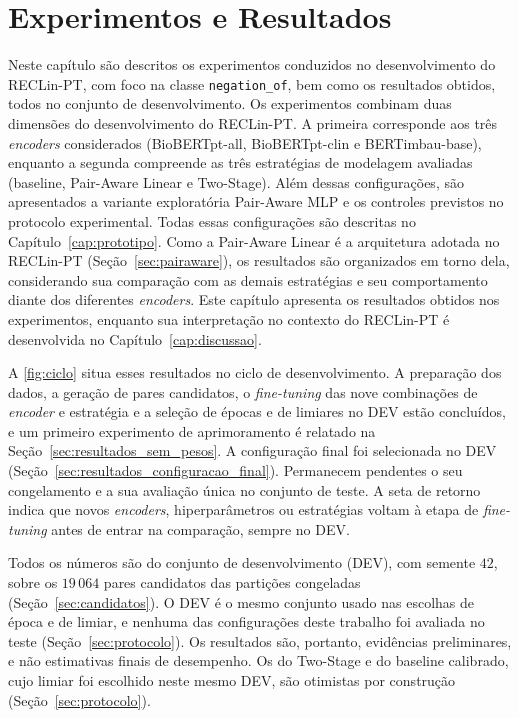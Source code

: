 \chapter[Experimentos e Resultados]{Experimentos e Resultados}
\label{cap:experimentos}

Neste capítulo são descritos os experimentos conduzidos no desenvolvimento do
RECLin-PT, com foco na classe \texttt{negation\_of}, bem como os resultados obtidos, todos no conjunto de desenvolvimento. Os experimentos combinam duas dimensões do desenvolvimento do RECLin-PT. A primeira corresponde aos três \emph{encoders} considerados (BioBERTpt-all, BioBERTpt-clin e BERTimbau-base), enquanto a segunda compreende as três estratégias de modelagem avaliadas (baseline, Pair-Aware Linear e Two-Stage). Além dessas configurações, são apresentados a variante exploratória Pair-Aware MLP e os controles previstos no protocolo experimental. Todas essas configurações são descritas no Capítulo~\ref{cap:prototipo}. Como a Pair-Aware Linear é a arquitetura adotada no RECLin-PT (Seção~\ref{sec:pairaware}), os resultados são organizados em torno dela, considerando sua comparação com as demais estratégias e seu comportamento diante dos diferentes \emph{encoders}. Este capítulo apresenta os resultados obtidos nos experimentos, enquanto sua interpretação no contexto do RECLin-PT é desenvolvida no Capítulo~\ref{cap:discussao}.

A \autoref{fig:ciclo} situa esses resultados no ciclo de desenvolvimento. A preparação
dos dados, a geração de pares candidatos, o \emph{fine-tuning} das nove combinações de
\emph{encoder} e estratégia e a seleção de épocas e de limiares no DEV estão
concluídos, e um primeiro experimento de aprimoramento é relatado na Seção~\ref{sec:resultados_sem_pesos}. A configuração final foi
selecionada no DEV (Seção~\ref{sec:resultados_configuracao_final}). Permanecem
pendentes o seu congelamento e a sua avaliação única no conjunto de teste. A seta de retorno indica que novos \emph{encoders}, hiperparâmetros ou
estratégias voltam à etapa de \emph{fine-tuning} antes de entrar na comparação,
sempre no DEV.



Todos os números são do conjunto de desenvolvimento (DEV), com semente $42$, sobre os
$19\,064$ pares candidatos das partições congeladas (Seção~\ref{sec:candidatos}). O
DEV é o mesmo conjunto usado nas escolhas de época e de limiar, e nenhuma das
configurações deste trabalho foi avaliada no teste (Seção~\ref{sec:protocolo}). Os
resultados são, portanto, evidências preliminares, e não estimativas finais de
desempenho. Os do Two-Stage e do baseline calibrado, cujo limiar foi escolhido neste
mesmo DEV, são otimistas por construção (Seção~\ref{sec:protocolo}).


